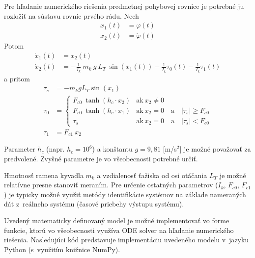 \documentclass[a4paper, 10pt, ]{article}
\begin{document}
Pre hľadanie numerického riešenia predmetnej pohybovej rovnice je potrebné ju rozložiť na sústavu rovníc prvého rádu. Nech
\begin{subequations}
\begin{align}
    x_1(t) &= \varphi(t) \\
    x_2(t) &= \dot \varphi(t)
\end{align}
\end{subequations}
Potom
\begin{subequations}
\begin{align}
    \dot x_1(t) &= x_2(t) \\
    \dot x_2(t) &= - \frac{1}{I_k}\ m_k \  g \   L_T\  \sin(x_1(t)) - \frac{1}{I_k} \tau_0(t) - \frac{1}{I_k} \tau_1(t)
\end{align}
\end{subequations}
a pritom
\begin{subequations}
\begin{align}
    \tau_s &= - m_k g L_T \sin(x_1) \\
    \tau_0 &= 
    \begin{cases} 
        F_{c0} \ \tanh(h_c\cdot x_2) & \text{ak}   \ x_2 \neq 0  \\
        F_{c0} \ \tanh(h_c\cdot      x_1) & \text{ak}   \ x_2 = 0 \quad \text{a} \quad \left|\tau_s\right| \geq F_{c0} \\
        \tau_s &  \text{ak}  \ x_2 = 0 \quad \text{a} \quad \left|\tau_s\right| < F_{c0}
    \end{cases}  \\
    \tau_1 &= F_{c1} \ x_2
\end{align}
\end{subequations}

Parameter $h_c$ (napr. $h_c = 10^6$) a konštantu $g = 9,81$ [m/s\(^2\)] je možné považovať za predvolené. Zvyšné parametre je vo všeobecnosti potrebné určiť.

Hmotnosť ramena kyvadla $m_k$ a vzdialenosť ťažiska od osi otáčania $L_T$ je možné relatívne presne stanoviť meraním. Pre určenie ostatných parametrov ($I_k$, $F_{c0}$, $F_{c1}$) je typicky možné využiť metódy identifikácie systémov na základe nameraných dát z~reálneho systému (časové priebehy výstupu systému).

Uvedený matematicky definovaný model je možné implementovať vo forme funkcie, ktorú vo všeobecnosti využíva ODE solver na hľadanie numerického riešenia. Nasledujúci kód predstavuje implementáciu uvedeného modelu v~jazyku Python (s~využitím knižnice NumPy). 
\end{document}
